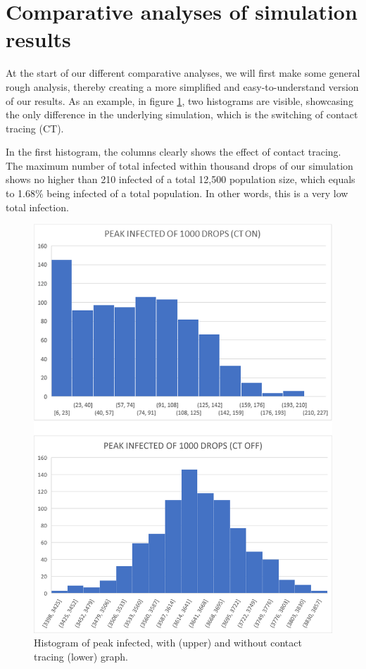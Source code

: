 \section{Comparative analyses of simulation results}

At the start of our different comparative analyses, we will first make some general rough analysis, thereby creating a more simplified and easy-to-understand version of our results. As an example, in figure \ref{fig:peak_infected}, two histograms are visible, showcasing the only difference in the underlying simulation, which is the switching of contact tracing (CT). 

In the first histogram, the columns clearly shows the effect of contact tracing. The maximum number of total infected within thousand drops of our simulation shows no higher than 210 infected of a total 12,500 population size, which equals to 1.68\% being infected of a total population. In other words, this is a very low total infection. 

\begin{figure}[H]
  \centering
  \includegraphics[width=\textwidth]{0_billeder/Peak_infected_graph.png}
  \caption{Histogram of peak infected, with (upper) and without contact tracing (lower) graph.}
  \label{fig:peak_infected}
\end{figure}


